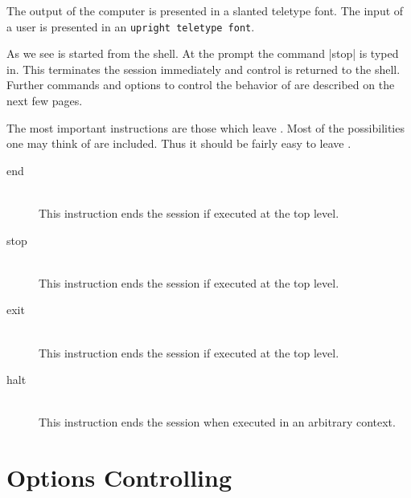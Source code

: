 The output of the computer is presented in a {\itt slanted teletype font}. The
input of a user is presented in an {\tt upright teletype font}.

As we see \ProTop{}   is started from the  shell.  At the prompt the   command
|stop| is  typed in. This terminates  the  session immediately and  control is
returned to the shell. Further commands and options to control the behavior of
\ProTop{} are described on the next few pages.

The most important  instructions are those which  leave \ProTop.   Most of the
possibilities one may think of are included. Thus it should  be fairly easy to
leave \ProTop.

\begin{description}
  \item [end]\ \\
  This instruction ends the session if executed at the top level.
  \item [stop]\ \\
  This instruction ends the session if executed at the top level.
  \item [exit]\ \\
  This instruction ends the session if executed at the top level.
  \item [halt]\ \\
  This instruction ends the session when executed in an arbitrary context.
\end{description}

\section{Options Controlling \ProTop}

